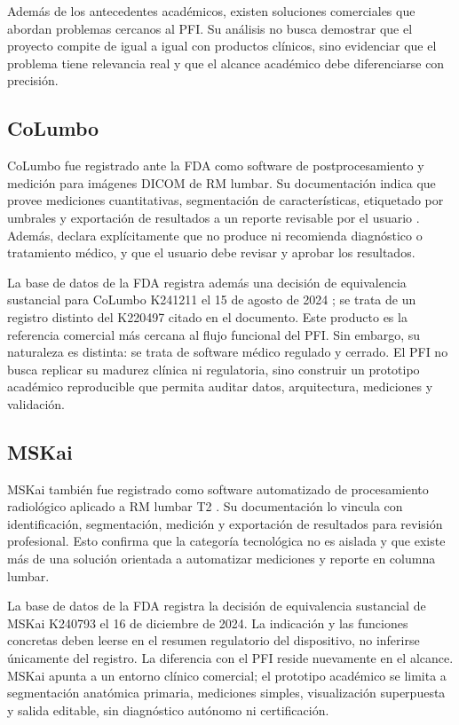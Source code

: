 Además de los antecedentes académicos, existen soluciones comerciales que abordan problemas cercanos al PFI. Su análisis no busca demostrar que el proyecto compite de igual a igual con productos clínicos, sino evidenciar que el problema tiene relevancia real y que el alcance académico debe diferenciarse con precisión.

\subsection{CoLumbo}

CoLumbo fue registrado ante la FDA como software de postprocesamiento y medición para imágenes DICOM de RM lumbar. Su documentación indica que provee mediciones cuantitativas, segmentación de características, etiquetado por umbrales y exportación de resultados a un reporte revisable por el usuario \parencite{fda_columbo_2022}. Además, declara explícitamente que no produce ni recomienda diagnóstico o tratamiento médico, y que el usuario debe revisar y aprobar los resultados.

La base de datos de la FDA registra además una decisión de equivalencia sustancial para CoLumbo K241211 el 15 de agosto de 2024 \parencite{fda_columbo_2024}; se trata de un registro distinto del K220497 citado en el documento. Este producto es la referencia comercial más cercana al flujo funcional del PFI. Sin embargo, su naturaleza es distinta: se trata de software médico regulado y cerrado. El PFI no busca replicar su madurez clínica ni regulatoria, sino construir un prototipo académico reproducible que permita auditar datos, arquitectura, mediciones y validación.

\subsection{MSKai}

MSKai también fue registrado como software automatizado de procesamiento radiológico aplicado a RM lumbar T2 \parencite{fda_mskai_2024}. Su documentación lo vincula con identificación, segmentación, medición y exportación de resultados para revisión profesional. Esto confirma que la categoría tecnológica no es aislada y que existe más de una solución orientada a automatizar mediciones y reporte en columna lumbar.

La base de datos de la FDA registra la decisión de equivalencia sustancial de MSKai K240793 el 16 de diciembre de 2024. La indicación y las funciones concretas deben leerse en el resumen regulatorio del dispositivo, no inferirse únicamente del registro. La diferencia con el PFI reside nuevamente en el alcance. MSKai apunta a un entorno clínico comercial; el prototipo académico se limita a segmentación anatómica primaria, mediciones simples, visualización superpuesta y salida editable, sin diagnóstico autónomo ni certificación.

